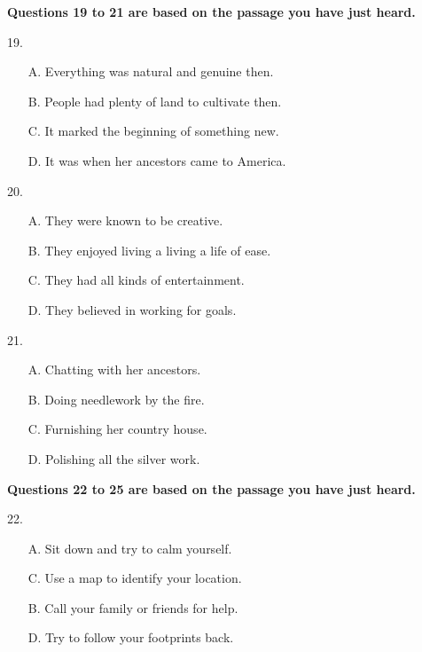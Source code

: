 \documentclass[UTF8,11pt]{ctexart}
\begin{document}
\textbf{Questions 19 to 21 are based on the passage you have just heard.}


19.


\begin{itemize}[leftmargin=2em,itemsep=.2em,topsep=.4em]\item[A.] Everything was natural and genuine then.
\item[B.] People had plenty of land to cultivate then.
\item[C.] It marked the beginning of something new.
\item[D.] It was when her ancestors came to America.
\end{itemize}

20.


\begin{itemize}[leftmargin=2em,itemsep=.2em,topsep=.4em]\item[A.] They were known to be creative.
\item[B.] They enjoyed living a living a life of ease.
\item[C.] They had all kinds of entertainment.
\item[D.] They believed in working for goals.
\end{itemize}

21.


\begin{itemize}[leftmargin=2em,itemsep=.2em,topsep=.4em]\item[A.] Chatting with her ancestors.
\item[B.] Doing needlework by the fire.
\item[C.] Furnishing her country house.
\item[D.] Polishing all the silver work.
\end{itemize}

\textbf{Questions 22 to 25 are based on the passage you have just heard.}


22.


\begin{itemize}[leftmargin=2em,itemsep=.2em,topsep=.4em]\item[A.] Sit down and try to calm yourself.
\item[C.] Use a map to identify your location.
\end{itemize}

\begin{itemize}[leftmargin=2em,itemsep=.2em,topsep=.4em]\item[B.] Call your family or friends for help.
\item[D.] Try to follow your footprints back.
\end{itemize}
\end{document}
